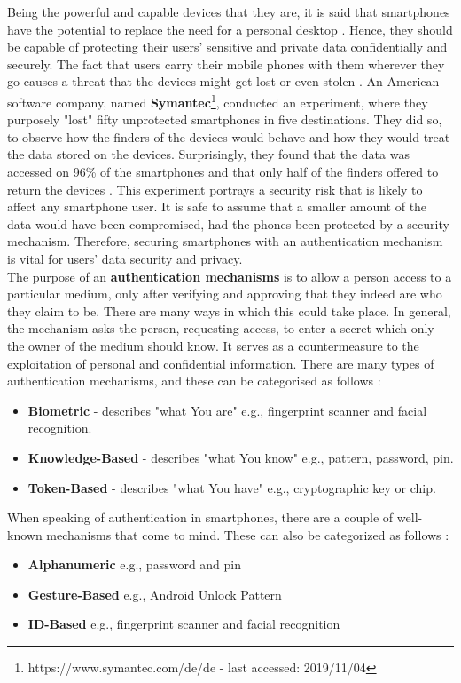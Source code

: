 Being the powerful and capable devices that they are, it is said that smartphones have the potential to replace the need for a personal desktop \cite{Alsaleh}. Hence, they should be capable of protecting their users' sensitive and private data confidentially and securely. The fact that users carry their mobile phones with them wherever they go causes a threat that the devices might get lost or even stolen \cite{Egelman:2014:YRL:2660267.2660273}. An American software company, named \textbf{Symantec}\footnote{https://www.symantec.com/de/de - last accessed: 2019/11/04}, conducted an experiment, where they purposely "lost" fifty unprotected smartphones in five destinations. They did so, to observe how the finders of the devices would behave and how they would treat the data stored on the devices. Surprisingly, they found that the data was accessed on 96\% of the smartphones and that only half of the finders offered to return the devices \cite{symantec}.  This experiment portrays a security risk that is likely to affect any smartphone user.  It is safe to assume that a smaller amount of the data would have been compromised, had the phones been protected by a security mechanism. Therefore, securing smartphones with an authentication mechanism is vital for users' data security and privacy.\\

The purpose of an \textbf{authentication mechanisms} is to allow a person access to a particular medium, only after verifying and approving that they indeed are who they claim to be. There are many ways in which this could take place. In general, the mechanism asks the person, requesting access, to enter a secret which only the owner of the medium should know. It serves as a countermeasure to the exploitation of personal and confidential information. There are many types of authentication mechanisms, and these can be categorised as follows \cite{gorman}: 
\begin{itemize}
    \item \textbf{Biometric} - describes "what You are" e.g., fingerprint scanner and facial recognition.
    \item \textbf{Knowledge-Based} - describes "what You know" e.g., pattern, password, pin.
    \item \textbf{Token-Based} - describes "what You have" e.g., cryptographic key or chip.
\end{itemize}


When speaking of authentication in smartphones, there are a couple of well-known mechanisms that come to mind. These can also be categorized as follows \cite{ediss20251,gorman} : 
\begin{itemize}
    \item \textbf{Alphanumeric} e.g., password and pin
    \item \textbf{Gesture-Based} e.g., Android Unlock Pattern
    \item \textbf{ID-Based} e.g., fingerprint scanner and facial recognition 
\end{itemize}

